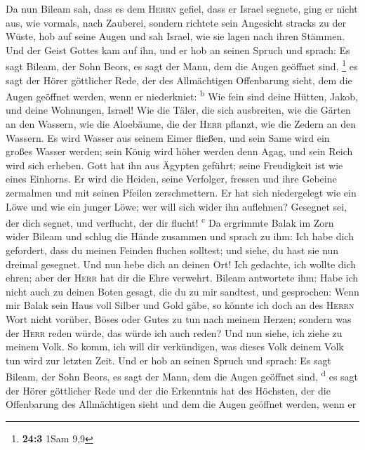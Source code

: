  Da nun Bileam sah, dass es dem \textsc{Herrn} gefiel,
dass er Israel segnete, ging er nicht aus, wie vormals, nach Zauberei,
sondern richtete sein Angesicht stracks zu der Wüste,  hob
auf seine Augen und sah Israel, wie sie lagen nach ihren Stämmen. Und
der Geist Gottes kam auf ihn,  und er hob an seinen Spruch
und sprach: Es sagt Bileam, der Sohn Beors, es sagt der Mann, dem die
Augen geöffnet sind, \footnote{\textbf{24:3} 1Sam 9,9}  es
sagt der Hörer göttlicher Rede, der des Allmächtigen Offenbarung sieht,
dem die Augen geöffnet werden, wenn er niederkniet: \textsuperscript{b}
 Wie fein sind deine Hütten, Jakob, und deine Wohnungen,
Israel!  Wie die Täler, die sich ausbreiten, wie die
Gärten an den Wassern, wie die Aloebäume, die der \textsc{Herr} pflanzt,
wie die Zedern an den Wassern.  Es wird Wasser aus seinem
Eimer fließen, und sein Same wird ein großes Wasser werden; sein König
wird höher werden denn Agag, und sein Reich wird sich erheben.
 Gott hat ihn aus Ägypten geführt; seine Freudigkeit ist
wie eines Einhorns. Er wird die Heiden, seine Verfolger, fressen und
ihre Gebeine zermalmen und mit seinen Pfeilen zerschmettern.
 Er hat sich niedergelegt wie ein Löwe und wie ein junger
Löwe; wer will sich wider ihn auflehnen? Gesegnet sei, der dich segnet,
und verflucht, der dir flucht! \textsuperscript{c}  Da
ergrimmte Balak im Zorn wider Bileam und schlug die Hände zusammen und
sprach zu ihm: Ich habe dich gefordert, dass du meinen Feinden fluchen
solltest; und siehe, du hast sie nun dreimal gesegnet. 
Und nun hebe dich an deinen Ort! Ich gedachte, ich wollte dich ehren;
aber der \textsc{Herr} hat dir die Ehre verwehrt.  Bileam
antwortete ihm: Habe ich nicht auch zu deinen Boten gesagt, die du zu
mir sandtest, und gesprochen:  Wenn mir Balak sein Haus
voll Silber und Gold gäbe, so könnte ich doch an des \textsc{Herrn} Wort
nicht vorüber, Böses oder Gutes zu tun nach meinem Herzen; sondern was
der \textsc{Herr} reden würde, das würde ich auch reden? 
Und nun siehe, ich ziehe zu meinem Volk. So komm, ich will dir
verkündigen, was dieses Volk deinem Volk tun wird zur letzten Zeit.
 Und er hob an seinen Spruch und sprach: Es sagt Bileam,
der Sohn Beors, es sagt der Mann, dem die Augen geöffnet sind,
\textsuperscript{d}  es sagt der Hörer göttlicher Rede
und der die Erkenntnis hat des Höchsten, der die Offenbarung des
Allmächtigen sieht und dem die Augen geöffnet werden, wenn er
